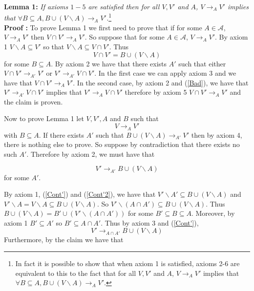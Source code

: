 \documentclass[11pt]{article}
\begin{document}
\noindent
\textbf{Lemma 1: }\textit{If axioms $1-5$ are satisfied then for all $V,V'$ and $A$, $V\rightarrow_{A} V'$ implies that $\forall B\subseteq A, B\cup (V\backslash A) \rightarrow_{A} V'$.}\footnote{In fact it is possible to show that when axiom 1 is satisfied, axioms 2-6 are equivalent to this to the fact that for all $V,V'$ and $A$, $V\rightarrow_{A} V'$ implies that $\forall B\subseteq A, B\cup (V\backslash A) \rightarrow_{A} V'$.}
\\

\noindent
\textbf{Proof :} To prove Lemma 1 we first need to prove that if for some $A\in \mathcal{A}$,  $V\rightarrow_{A}V'$ then $V \cap V' \rightarrow_{A} V'$. So suppose that for some $A\in \mathcal{A}$,  $V\rightarrow_{A}V'$. By axiom 1 $V\backslash A\subseteq V'$ so that $V\backslash A \subseteq V\cap V'$. Thus 
\begin{equation}
V\cap V'=B\cup (V\backslash A)
\label{Bad}
\end{equation}
for some $B\subseteq A$. By axiom 2 we have that there exists $A'$ such that either $V\cap V'\rightarrow_{A'} V'$ or $V'\rightarrow_{A'}V\cap V'$. In the first case we can apply axiom 3 and we have that $V\cap V'\rightarrow_{A} V'$. In the second case, by axiom 2 and (\ref{Bad}), we have that $V'\rightarrow_{A'}V\cap V'$ implies that $V'\rightarrow_{A}V\cap V'$ therefore by axiom 5  $V\cap V'\rightarrow_{A}V'$ and the claim is proven. 

Now to prove Lemma 1 let $V,V', A$ and $B$ such that
\begin{equation}
V\rightarrow_{A} V'
\label{Cont'2}
\end{equation}
with $B \subseteq A$. If there exists $A'$ such that $B\cup (V\backslash A)\rightarrow_{A'} V'$ then by axiom 4, there is nothing else to prove. So suppose by contradiction that there exists no such $A'$. Therefore by axiom 2, we must have that  

\begin{equation}
V'\rightarrow_{A'} B\cup (V\backslash A)
\label{Cont'}
\end{equation}
for some $A'$.

By axiom 1, (\ref{Cont'}) and (\ref{Cont'2}), we have that $V'\backslash A'\subseteq B\cup (V\backslash A)$ and $V'\backslash A=V\backslash A \subseteq B\cup (V\backslash A)$. So $V'\backslash (A\cap A')\subseteq B\cup (V\backslash A)$. Thus $B\cup (V\backslash A)= B'\cup (V'\backslash ( A\cap A'))$ for some $B'\subseteq B \subseteq A$. Moreover, by axiom 1 $B'\subseteq A'$ so $B'\subseteq A\cap A'$. Thus by axiom 3 and (\ref{Cont'}), 
\begin{equation}
V'\rightarrow_{A\cap A'} B\cup (V\backslash A)
\label{Cont'4}
\end{equation}
Furthermore, by the claim we have that 
\end{document}
